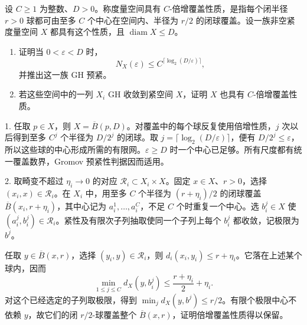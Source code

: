 \begin{exercise}\label{g3:ex:doubling-gh-precompact}
	设 \(C\ge1\) 为整数、\(D>0\)。称度量空间具有 \(C\)-倍增覆盖性质，是指每个闭半径 \(r>0\) 球都可由至多 \(C\) 个中心在空间内、半径为 \(r/2\) 的闭球覆盖。设一族非空紧度量空间 \(X\) 都具有这个性质，且 \(\operatorname{diam}X\le D\)。
	\begin{enumerate}
		\item 证明当 \(0<\varepsilon<D\) 时，
		\[
			N_X(\varepsilon)\le C^{\lceil\log_2(D/\varepsilon)\rceil},
		\]
		并推出这一族 GH 预紧。
		\item 若这些空间中的一列 \(X_i\) GH 收敛到紧空间 \(X\)，证明 \(X\) 也具有 \(C\)-倍增覆盖性质。
	\end{enumerate}
\end{exercise}
\begin{solution}
	1. 任取 \(p\in X\)，则 \(X=\overline B(p,D)\)。对覆盖中的每个球反复使用倍增性质，\(j\) 次以后得到至多 \(C^j\) 个半径为 \(D/2^j\) 的闭球。取 \(j=\lceil\log_2(D/\varepsilon)\rceil\)，便有 \(D/2^j\le\varepsilon\)，所以这些球的中心形成所需的有限网。\(\varepsilon\ge D\) 时一个中心已足够。所有尺度都有统一覆盖数界，Gromov 预紧性判据因而适用。

	2. 取畸变不超过 \(\eta_i\to0\) 的对应 \(\mathcal R_i\subset X_i\times X\)。固定 \(x\in X\)、\(r>0\)，选择 \((x_i,x)\in\mathcal R_i\)。在 \(X_i\) 中，用至多 \(C\) 个半径为 \((r+\eta_i)/2\) 的闭球覆盖 \(\overline B(x_i,r+\eta_i)\)，其中心记为 \(a_i^1,\ldots,a_i^C\)，不足 \(C\) 个时重复一个中心。选 \(b_i^j\in X\) 使 \((a_i^j,b_i^j)\in\mathcal R_i\)。紧性及有限次子列抽取使同一个子列上每个 \(b_i^j\) 都收敛，记极限为 \(b^j\)。

	任取 \(y\in\overline B(x,r)\)，选择 \((y_i,y)\in\mathcal R_i\)，则 \(d_i(x_i,y_i)\le r+\eta_i\)。它落在上述某个球内，因而
	\[
		\min_{1\le j\le C}d_X(y,b_i^j)
		\le\frac{r+\eta_i}{2}+\eta_i.
	\]
	对这个已经选定的子列取极限，得到 \(\min_jd_X(y,b^j)\le r/2\)。有限个极限中心不依赖 \(y\)，故它们的闭 \(r/2\)-球覆盖整个 \(\overline B(x,r)\)，证明倍增覆盖性质得以保留。
\end{solution}

